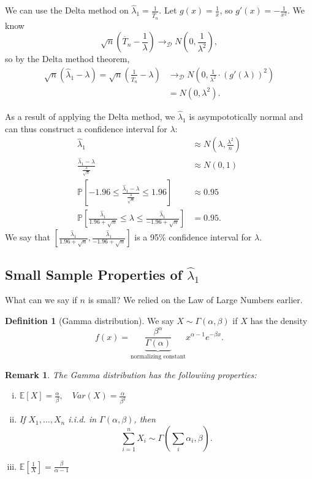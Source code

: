 \documentclass{tufte-handout}
\newcommand*\E{\mathbb{E}}
\renewcommand{\P}{\mathbb{P}}
\newtheorem{rmk}[thm]{Remark}
\theoremstyle{definition}
\newtheorem{defn}[thm]{Definition}
\begin{document}
We can use the Delta method on $\hat{\lambda}_1 = \frac{1}{\overline{T}_n}$.
Let $g(x) = \frac{1}{x}$, so $g'(x) = -\frac{1}{x^2}$. We know \[
	\sqrt{n} \left( \overline{T}_n - \frac{1}{\lambda} \right) \to_{\mathscr{D}} N(0,\frac{1}{\lambda^2})
,\] so by the Delta method theorem,
\begin{align*}
	\sqrt{n} \left( \hat{\lambda}_1 - \lambda \right) =\sqrt{n} \left( \frac{1}{\overline{T}_n} - \lambda \right) &\to_{\mathscr{D}} N\left( 0, \frac{1}{\lambda^2} \cdot \left( g'(\lambda) \right)^2 \right) \\
															   &= N\left( 0, \lambda^2 \right)
.\end{align*}

As a result of applying the Delta method, we $\hat{\lambda}_1$ is asympototically normal and can thus construct a confidence interval for $\lambda$:
\begin{align*}
	\hat{\lambda}_1 &\approx N\left( \lambda, \frac{\lambda^2}{n} \right) \\
	\frac{\hat{\lambda}_1-\lambda}{\frac{\lambda}{\sqrt{n} }} &\approx N(0,1) \\
	\P\left[-1.96 \le \frac{\hat{\lambda}_1 - \lambda}{\frac{\lambda}{\sqrt{n} }} \le 1.96\right] &\approx 0.95 \\
	\P\left[\frac{\hat{\lambda}_1}{1.96 + \sqrt{n} } \le \lambda \le \frac{\hat{\lambda}_1}{-1.96 + \sqrt{n} }\right]  &= 0.95
.\end{align*}
We say that $\left[ \frac{\hat{\lambda}_1}{1.96 + \sqrt{n} },\frac{\hat{\lambda}_1}{-1.96 + \sqrt{n} }  \right] $ is a 95\% confidence interval for $\lambda$.

\subsection{Small Sample Properties of $\hat{\lambda}_1$}

What can we say if $n$ is small? We relied on the Law of Large Numbers earlier. 
\begin{defn}[Gamma distribution]
	We say $X \sim \Gamma\left( \alpha,\beta \right)$ if $X$ has the density \[
		f(x) = \underbrace{\frac{\beta^{\alpha}}{\Gamma(\alpha)}}_{\text{normalizing constant}} x^{\alpha-1}e^{-\beta x}
	.\] 
\end{defn}

\begin{rmk}
	The Gamma distribution has the followiing properties:
	\begin{enumerate}[(i)]
		\item $\E\left[X\right] = \frac{\alpha}{\beta}, \quad Var(X) = \frac{\alpha}{\beta^2}$
		\item If $X_1,\ldots,X_n$ i.i.d. in $\Gamma(\alpha, \beta)$, then \[
			\sum\limits_{i=1}^{n} X_i \sim \Gamma(\sum_{i}^{} \alpha_i, \beta)
		.\] 
		\item $\E\left[\frac{1}{X}\right] = \frac{\beta}{\alpha - 1}$
	\end{enumerate}
\end{rmk}
\end{document}

